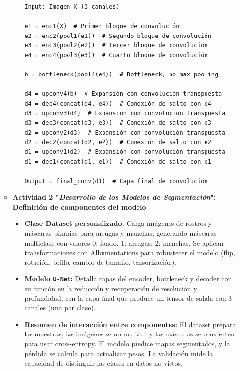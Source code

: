\begin{enumerate}
\begin{itemize}
\begin{itemize}
\begin{verbatim}
Input: Imagen X (3 canales)

e1 = enc1(X)  # Primer bloque de convolución
e2 = enc2(pool1(e1))  # Segundo bloque de convolución
e3 = enc3(pool2(e2))  # Tercer bloque de convolución
e4 = enc4(pool3(e3))  # Cuarto bloque de convolución

b = bottleneck(pool4(e4))  # Bottleneck, no max pooling

d4 = upconv4(b)  # Expansión con convolución transpuesta
d4 = dec4(concat(d4, e4))  # Conexión de salto con e4
d3 = upconv3(d4)  # Expansión con convolución transpuesta
d3 = dec3(concat(d3, e3))  # Conexión de salto con e3
d2 = upconv2(d3)  # Expansión con convolución transpuesta
d2 = dec2(concat(d2, e2))  # Conexión de salto con e2
d1 = upconv1(d2)  # Expansión con convolución transpuesta
d1 = dec1(concat(d1, e1))  # Conexión de salto con e1

Output = final_conv(d1)  # Capa final de convolución
\end{verbatim}

\end{itemize}



  \item\textbf{Actividad 2 "\textit{Desarrollo de los Modelos de Segmentación}": Definición de componentes del modelo}
  \begin{itemize}
    \item \textbf{Clase Dataset personalizado:} Carga imágenes de rostros y máscaras binarias para arrugas y manchas, generando máscaras multiclase con valores {0: fondo, 1: arrugas, 2: manchas}. Se aplican transformaciones con Albumentations para robustecer el modelo (flip, rotación, brillo, cambio de tamaño, tensorización).
    \item \textbf{Modelo \texttt{U-Net}:} Detalla capas del encoder, bottleneck y decoder con su función en la reducción y recuperación de resolución y profundidad, con la capa final que produce un tensor de salida con 3 canales (una por clase).
    \item \textbf{Resumen de interacción entre componentes:} El dataset prepara las muestras; las imágenes se normalizan y las máscaras se convierten para usar cross-entropy. El modelo predice mapas segmentados, y la pérdida se calcula para actualizar pesos. La validación mide la capacidad de distinguir las clases en datos no vistos.
  \end{itemize}
\end{itemize}


\end{enumerate}
